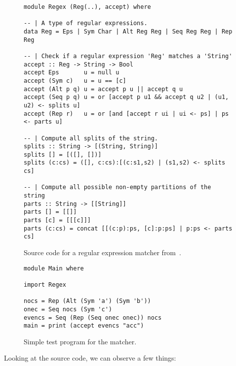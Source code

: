 \begin{figure}
\begin{lstlisting}
module Regex (Reg(..), accept) where

-- | A type of regular expressions.
data Reg = Eps | Sym Char | Alt Reg Reg | Seq Reg Reg | Rep Reg

-- | Check if a regular expression 'Reg' matches a 'String'
accept :: Reg -> String -> Bool
accept Eps       u = null u
accept (Sym c)   u = u == [c]
accept (Alt p q) u = accept p u || accept q u
accept (Seq p q) u = or [accept p u1 && accept q u2 | (u1, u2) <- splits u]
accept (Rep r)   u = or [and [accept r ui | ui <- ps] | ps <- parts u]

-- | Compute all splits of the string.
splits :: String -> [(String, String)]
splits [] = [([], [])]
splits (c:cs) = ([], c:cs):[(c:s1,s2) | (s1,s2) <- splits cs]

-- | Compute all possible non-empty partitions of the string
parts :: String -> [[String]]
parts [] = [[]]
parts [c] = [[[c]]]
parts (c:cs) = concat [[(c:p):ps, [c]:p:ps] | p:ps <- parts cs]
\end{lstlisting}
\caption{Source code for a regular expression matcher from~\cite{Fischer:2010:PRE:1863543.1863594}.}
\begin{lstlisting}
module Main where

import Regex

nocs = Rep (Alt (Sym 'a') (Sym 'b'))
onec = Seq nocs (Sym 'c')
evencs = Seq (Rep (Seq onec onec)) nocs
main = print (accept evencs "acc")
\end{lstlisting}
\caption{Simple test program for the matcher.}
\label{fig:matcher-haskell98}
\end{figure}

Looking at the source code, we can observe a few things:

